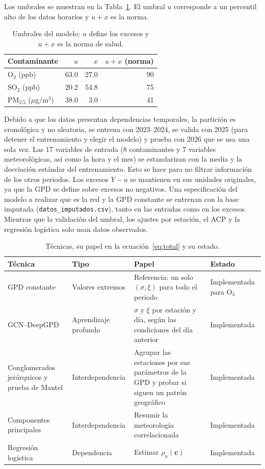 \documentclass[11pt]{article}
\begin{document}
Los umbrales se muestran en la Tabla~\ref{tab:umbrales}. El umbral $u$ corresponde a un percentil alto de los datos horarios y $u+x$ es la norma. 

\begin{table}[H]
\centering
\small
\caption{Umbrales del modelo: $u$ define los excesos y $u+x$ es la norma de salud.}
\vspace{5pt}
\label{tab:umbrales}
\begin{tabular}{lrrr}
\toprule
\textbf{Contaminante} & $u$ & $x$ & $u + x$ \textbf{(norma)} \\
\midrule
O$_3$ (ppb)                 & 63.0 & 27.0 & 90 \\
SO$_2$ (ppb)                & 20.2 & 54.8 & 75 \\
PM$_{2.5}$ ($\mu$g/m$^3$)   & 38.0 & 3.0  & 41 \\
\bottomrule
\end{tabular}
\end{table}
 
Debido a que los datos presentan dependencias temporales, la partición es cronológica y no aleatoria, se entrena con 2023--2024, se valida con 2025 (para detener el entrenamiento y elegir el modelo) y prueba con 2026 que se usa una sola vez. Las 17 variables de entrada (8 contaminantes y 7 variables meteorológicas, así como la hora y el mes) se estandarizan con la media y la desviación estándar del entrenamiento. Esto se hace para no filtrar información de los otros periodos. Los excesos $Y-u$ se mantienen en sus unidades originales, ya que la GPD se define sobre excesos no negativos. Una especificación del modelo a realizar que es la red y la GPD constante se entrenan con la base imputada  (\texttt{datos\_imputados.csv}), tanto en las entradas como en los excesos. Mientras que la validación del umbral, los ajustes por estación, el ACP y la regresión logística solo usan datos observados. 

\begin{table}[H]
\centering
\small
\caption{Técnicas, su papel en la ecuación~\eqref{eq:total} y su estado.}
\vspace{5pt}
\label{tab:tecnicas}
\begin{tabular}{p{2.8cm}p{2.3cm}p{4.6cm}p{2.4cm}}
\toprule
\textbf{Técnica} & \textbf{Tipo} & \textbf{Papel} & \textbf{Estado} \\
\midrule
GPD constante & Valores extremos & Referencia: un solo $(\sigma, \xi)$ para todo el periodo & Implementada para  O$_3$  \\
GCN--DeepGPD & Aprendizaje profundo & $\sigma$ y $\xi$ por estación y día, según las condiciones del día anterior & Implementada \\
Conglomerados jerárquicos y prueba de Mantel & Interdependencia & Agrupar las estaciones por sus parámetros de la GPD y probar si siguen un patrón geográfico & Implementada \\
Componentes principales & Interdependencia & Resumir la meteorología correlacionada & Implementada\\
Regresión logística & Dependencia & Estimar $\rho_u(\mathbf{c})$ & Implementada \\
\bottomrule
\end{tabular}
\end{table}
\end{document}
